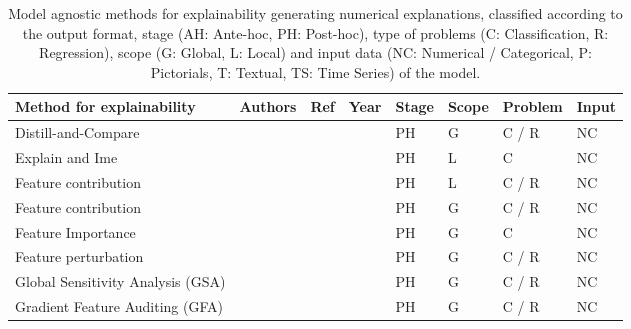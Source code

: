 \documentclass[final,1p,times]{elsarticle}
\begin{document}
\begin{table}[h!]
\footnotesize
    \caption{Model agnostic methods for explainability generating numerical explanations, classified according to the output format, stage (AH: Ante-hoc, PH: Post-hoc), type of problems (C: Classification, R: Regression), scope (G: Global, L: Local) and input data (NC: Numerical / Categorical, P: Pictorials, T: Textual, TS: Time Series) of the  model.}
    \label{tab:model-agnostic-numerical}
    \begin{tabular}{m{4.2cm} m{2.5cm} m{0.5cm} m{0.5cm} m{0.5cm} m{0.6cm} m{0.8cm} m{0.6cm}}
    \hline
    Method for explainability & Authors & Ref & Year & Stage & Scope & Problem & Input\\
    \hline
    Distill-and-Compare &  \citeauthor{tan2018distill} & \cite{tan2018distill} & \citeyear{tan2018distill} & PH & G & C / R & NC\\
    Explain and Ime & \citeauthor{robnik2008explaining,robnik2018explanation} & \cite{robnik2008explaining,robnik2018explanation} & \citeyear{robnik2008explaining,robnik2018explanation} & PH & L & C & NC\\
    Feature contribution &  \citeauthor{Kononenko10anefficient,kononenko2013explanation,vstrumbelj2009explaining} &  \cite{Kononenko10anefficient,kononenko2013explanation,vstrumbelj2009explaining} &  \citeyear{Kononenko10anefficient,kononenko2013explanation,vstrumbelj2009explaining} & PH & L & C / R & NC\\
    Feature contribution & \citeauthor{vstrumbelj2008towards,vstrumbelj2010explanation} & \cite{vstrumbelj2008towards,vstrumbelj2010explanation} & \citeyear{vstrumbelj2008towards,vstrumbelj2010explanation} & PH & G & C / R & NC\\
    Feature Importance &  \citeauthor{henelius2014peek} &  \cite{henelius2014peek} & \citeyear{henelius2014peek}& PH & G & C & NC\\
    Feature perturbation &  \citeauthor{vstrumbelj2014explaining} & \cite{vstrumbelj2014explaining} &  \citeyear{vstrumbelj2014explaining} & PH & G & C / R & NC\\
    Global Sensitivity Analysis (GSA) &  \citeauthor{cortez2011opening,cortez2013using} &  \cite{cortez2011opening,cortez2013using} &  \citeyear{cortez2011opening,cortez2013using} & PH & G & C / R & NC\\
    Gradient Feature Auditing (GFA) &  \citeauthor{adler2018auditing} &  \cite{adler2018auditing} &  \citeyear{adler2018auditing} & PH & G & C / R & NC\\

\end{tabular}
\end{table}
\end{document}
